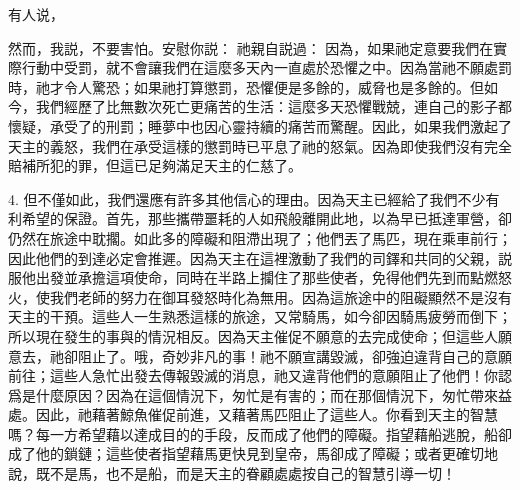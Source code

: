 有人说，\par

然而，我説，不要害怕。安慰你説： 祂親自説過： 因為，如果祂定意要我們在實際行動中受罰，就不會讓我們在這麼多天內一直處於恐懼之中。因為當祂不願處罰時，祂才令人驚恐；如果祂打算懲罰，恐懼便是多餘的，威脅也是多餘的。但如今，我們經歷了比無數次死亡更痛苦的生活：這麼多天恐懼戰兢，連自己的影子都懷疑，承受了的刑罰；睡夢中也因心靈持續的痛苦而驚醒。因此，如果我們激起了天主的義怒，我們在承受這樣的懲罰時已平息了祂的怒氣。因為即使我們沒有完全賠補所犯的罪，但這已足夠滿足天主的仁慈了。\par

4. 但不僅如此，我們還應有許多其他信心的理由。因為天主已經給了我們不少有利希望的保證。首先，那些攜帶噩耗的人如飛般離開此地，以為早已抵達軍營，卻仍然在旅途中耽擱。如此多的障礙和阻滯出現了；他們丟了馬匹，現在乘車前行；因此他們的到達必定會推遲。因為天主在這裡激動了我們的司鐸和共同的父親，説服他出發並承擔這項使命，同時在半路上攔住了那些使者，免得他們先到而點燃怒火，使我們老師的努力在御耳發怒時化為無用。因為這旅途中的阻礙顯然不是沒有天主的干預。這些人一生熟悉這樣的旅途，又常騎馬，如今卻因騎馬疲勞而倒下；所以現在發生的事與的情況相反。因為天主催促不願意的去完成使命；但這些人願意去，祂卻阻止了。哦，奇妙非凡的事！祂不願宣講毀滅，卻強迫違背自己的意願前往；這些人急忙出發去傳報毀滅的消息，祂又違背他們的意願阻止了他們！你認爲是什麼原因？因為在這個情況下，匆忙是有害的；而在那個情況下，匆忙帶來益處。因此，祂藉著鯨魚催促前進，又藉著馬匹阻止了這些人。你看到天主的智慧嗎？每一方希望藉以達成目的的手段，反而成了他們的障礙。指望藉船逃脫，船卻成了他的鎖鏈；這些使者指望藉馬更快見到皇帝，馬卻成了障礙；或者更確切地說，既不是馬，也不是船，而是天主的眷顧處處按自己的智慧引導一切！\par

